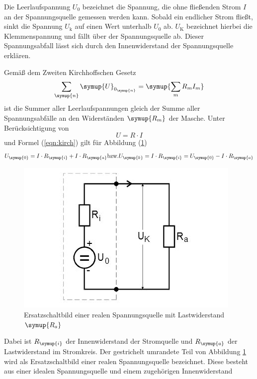Die Leerlaufspannung $U_{\text{0}}$ bezeichnet die Spannung, die ohne
fließenden Strom $I$ an der Spannungsquelle gemessen werden kann.
Sobald ein endlicher Strom fließt, sinkt die Spannung $U_{\text{k}}$ auf einen
Wert unterhalb $U_{\text{0}}$ ab. $U_{\text{K}}$ bezeichnet hierbei die
Klemmenspannung und fällt über der Spannungsquelle ab.
Dieser Spannungsabfall lässt sich durch den Innenwiderstand der Spannungsquelle
erklären.

Gemäß dem Zweiten Kirchhoffschen Gesetz
\begin{equation}
  \sum_\symup{n} \symup{U}_{0_\symup{n}} = \symup{\sum_m R_m I_m}
  \label{eqn:kirch}
\end{equation}
ist die Summer aller Leerlaufspannungen gleich der Summe aller
Spannungsabfälle an den Widerständen $\symup{R_m}$ der Masche.
Unter Berücksichtigung von
\begin{equation}
  U=R\cdot I
\end{equation}
und Formel (\ref{eqn:kirch}) gilt für Abbildung (\ref{fig:real})
\begin{equation}
  U_\symup{0}=I \cdot R_\symup{i} + I \cdot R_\symup{a}
  \text{bzw.}
  U_\symup{k}=I \cdot R_\symup{i} = U_\symup{0} - I \cdot R_\symup{a}
  \label{eqn:U0k}
\end{equation}
\begin{figure}[H]
   \centering
  \includegraphics{bilder/real}
  \caption{Ersatzschaltbild einer realen Spannungsquelle mit Lastwiderstand
  $\symup{R_a}$ \cite{301}}
  \label{fig:real}
\end{figure}
Dabei ist $R_\symup{i}$ der Innenwiderstand der Stromquelle und $R_\symup{a}$
der Lastwiderstand im Stromkreis.
Der gestrichelt umrandete Teil von Abbildung \ref{fig:real} wird als
Ersatzschaltbild einer realen Spannungsquelle bezeichnet. Diese besteht aus
einer idealen Spannungsquelle und einem zugehörigen Innenwiderstand
